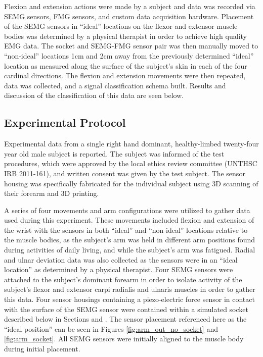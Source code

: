 \documentclass[twocolumn]{sagej}
\begin{document}
Flexion and extension actions were made by a subject and data was recorded via SEMG sensors, FMG sensors, and custom data acquisition hardware.  Placement of the SEMG sensors in ``ideal'' locations on the flexor and extensor muscle bodies was determined by a physical therapist in order to achieve high quality EMG data. The socket and SEMG-FMG sensor pair was then manually moved to ``non-ideal'' locations 1cm and 2cm away from the previously determined ``ideal'' location as measured along the surface of the subject's skin in each of the four cardinal directions.  The flexion and extension movements were then repeated, data was collected, and a signal classification schema built.  Results and discussion of the classification of this data are seen below.  \par \noindent

\subsection*{Experimental Protocol}
\label{sec:protocol}

Experimental data from a single right hand dominant, healthy-limbed twenty-four year old male subject is reported.  The subject was informed of the test procedures, which were approved by the local ethics review committee (UNTHSC IRB  2011-161), and written consent was given by the test subject.  The sensor housing was specifically fabricated for the individual subject using 3D scanning of their forearm and 3D printing.  \par \noindent
A series of four movements and arm configurations were utilized to gather data used during this experiment.  These movements included flexion and extension of the wrist with the sensors in both ``ideal'' and ``non-ideal'' locations relative to the muscle bodies, as the subject's arm was held in different arm positions found during activities of daily living, and while the subject's arm was fatigued.  Radial and ulnar deviation data was also collected as the sensors were in an ``ideal location'' as determined by a physical therapist. Four SEMG sensors were attached to the subject's dominant forearm in order to isolate activity of the subject's flexor and extensor carpi radialis and ulnaris muscles in order to gather this data.  Four sensor housings containing a piezo-electric force sensor in contact with the surface of the SEMG sensor were contained within a simulated socket described below in Sections \textit{} and \textit{}. The sensor placement referenced here as the ``ideal position'' can be seen in Figures \ref{fig:arm_out_no_socket} and \ref{fig:arm_socket}. All SEMG sensors were initially aligned to the muscle body during initial placement. \par \noindent
\end{document}
